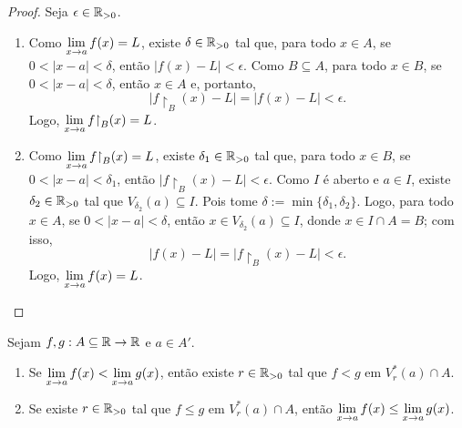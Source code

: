 \begin{proof}
    Seja $\epsilon \in \mathbb{R}_{>0}$.
        \begin{enumerate}[leftmargin=*, align=left, label=\textbf{(\alph*)}]
            \item Como $\displaystyle \lim_{x \to a} f(x) = L$, existe $\delta \in \mathbb{R}_{>0}$ tal que, para todo $x \in A$, se $0<|x-a|<\delta$, então $|f(x)-L|<\epsilon$. Como $B \subseteq A$, para todo $x \in B$, se $0<|x-a|<\delta$, então $x \in A$ e, portanto,
                \[
                    |f \restriction_B(x)-L| = |f(x)-L| < \epsilon.
                \]
            Logo, $\ds \lim_{x \to a} f \restriction_B(x) = L$. \blackproof
            \item Como $\ds \lim_{x \to a} f \restriction_B(x) = L$, existe $\delta_1 \in \mathbb{R}_{>0}$ tal que, para todo $x \in B$, se $0<|x-a|<\delta_1$, então $|f \restriction_B(x)-L|<\epsilon$. Como $I$ é aberto e $a \in I$, existe $\delta_2 \in \mathbb{R}_{>0}$ tal que $V_{\delta_2}(a) \subseteq I$. Pois tome $\delta := \min \{\delta_1, \delta_2\}$. Logo, para todo $x \in A$, se $0<|x-a|<\delta$, então $x \in V_{\delta_2}(a) \subseteq I$, donde $x \in I \cap A = B$; com isso,
                \[
                    |f(x)-L| = |f \restriction_B(x)-L| < \epsilon.
                \]
            Logo, $\displaystyle \lim_{x \to a} f(x) = L$. \blackproof
        \end{enumerate}
\end{proof}

\begin{theorem} \label{teo.calc1:conservacao_da_ordem}
    Sejam $f,g : A \subseteq \mathbb{R} \to \mathbb{R}$ e $a \in A'$.
        \begin{enumerate}[leftmargin=*, align=left, label=\textbf{(\alph*)}]
            \item Se $\displaystyle \lim_{x \to a} f(x) < \lim_{x \to a} g(x)$, então existe $r \in \mathbb{R}_{>0}$ tal que $f < g$ em $V^*_r(a) \cap A$.
            \item Se existe $r \in \mathbb{R}_{>0}$ tal que $f \leq g$ em $V^*_r(a) \cap A$, então $\displaystyle \lim_{x \to a} f(x) \leq \lim_{x \to a} g(x)$.
        \end{enumerate}
\end{theorem}

